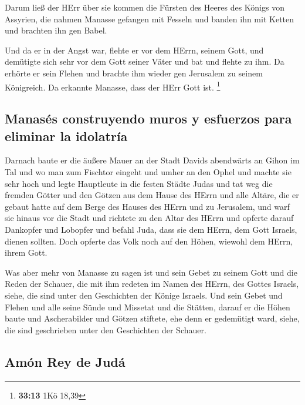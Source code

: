  Darum ließ der HErr über sie kommen die Fürsten des
Heeres des Königs von Assyrien, die nahmen Manasse gefangen mit Fesseln
und banden ihn mit Ketten und brachten ihn gen Babel.

 Und da er in der Angst war, flehte er vor dem HErrn,
seinem Gott, und demütigte sich sehr vor dem Gott seiner Väter
 und bat und flehte zu ihm. Da erhörte er sein Flehen und
brachte ihm wieder gen Jerusalem zu seinem Königreich. Da erkannte
Manasse, dass der HErr Gott ist. \footnote{\textbf{33:13} 1Kö 18,39}

\hypertarget{manasuxe9s-construyendo-muros-y-esfuerzos-para-eliminar-la-idolatruxeda}{%
\subsection{Manasés construyendo muros y esfuerzos para eliminar la
idolatría}\label{manasuxe9s-construyendo-muros-y-esfuerzos-para-eliminar-la-idolatruxeda}}

 Darnach baute er die äußere Mauer an der Stadt Davids
abendwärts an Gihon im Tal und wo man zum Fischtor eingeht und umher an
den Ophel und machte sie sehr hoch und legte Hauptleute in die festen
Städte Judas  und tat weg die fremden Götter und den
Götzen aus dem Hause des HErrn und alle Altäre, die er gebaut hatte auf
dem Berge des Hauses des HErrn und zu Jerusalem, und warf sie hinaus vor
die Stadt  und richtete zu den Altar des HErrn und
opferte darauf Dankopfer und Lobopfer und befahl Juda, dass sie dem
HErrn, dem Gott Israels, dienen sollten.  Doch opferte
das Volk noch auf den Höhen, wiewohl dem HErrn, ihrem Gott.

 Was aber mehr von Manasse zu sagen ist und sein Gebet zu
seinem Gott und die Reden der Schauer, die mit ihm redeten im Namen des
HErrn, des Gottes Israels, siehe, die sind unter den Geschichten der
Könige Israels.  Und sein Gebet und Flehen und alle seine
Sünde und Missetat und die Stätten, darauf er die Höhen baute und
Ascherabilder und Götzen stiftete, ehe denn er gedemütigt ward, siehe,
die sind geschrieben unter den Geschichten der Schauer.

\hypertarget{amuxf3n-rey-de-juduxe1}{%
\subsection{Amón Rey de Judá}\label{amuxf3n-rey-de-juduxe1}}

